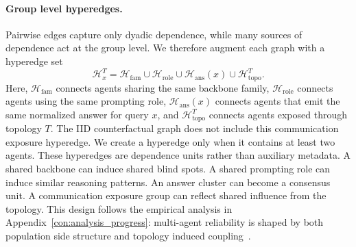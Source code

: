 \paragraph{Group level hyperedges.}
Pairwise edges capture only dyadic dependence, while many sources of dependence act at the group level. 
We therefore augment each graph with a hyperedge set
\begin{equation}
   \mathcal{H}_x^T
=
\mathcal{H}_{\mathrm{fam}}
\cup
\mathcal{H}_{\mathrm{role}}
\cup
\mathcal{H}_{\mathrm{ans}}(x)
\cup
\mathcal{H}_{\mathrm{topo}}^T.
\end{equation}
Here, $\mathcal{H}_{\mathrm{fam}}$ connects agents sharing the same backbone family, 
$\mathcal{H}_{\mathrm{role}}$ connects agents using the same prompting role, 
$\mathcal{H}_{\mathrm{ans}}(x)$ connects agents that emit the same normalized answer for query $x$, 
and $\mathcal{H}_{\mathrm{topo}}^T$ connects agents exposed through topology $T$.
The IID counterfactual graph does not include this communication exposure hyperedge.
We create a hyperedge only when it contains at least two agents. 
These hyperedges are dependence units rather than auxiliary metadata. 
A shared backbone can induce shared blind spots. 
A shared prompting role can induce similar reasoning patterns. 
An answer cluster can become a consensus unit. 
A communication exposure group can reflect shared influence from the topology. 
This design follows the empirical analysis in Appendix~\ref{con:analysis_progress}: multi-agent reliability is shaped by both population side structure and topology induced coupling~\cite{li2026graph}.
